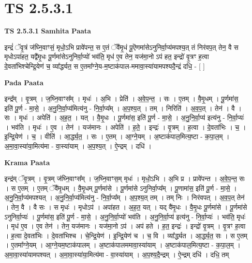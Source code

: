\documentclass[17pt]{extarticle}
\begin{document}
\section{ TS 2.5.3.1 }

\textbf{TS 2.5.3.1 } \newline
\textbf{Samhita Paata} \newline

इन्द्रं॑ ॅवृ॒त्रं ज॑घ्नि॒वाꣳसं॒ मृधो॒ऽभि प्रावे॑पन्त॒ स ए॒तं ॅवै॑मृ॒धं पू॒ऎणमा॑सेऽनुनिर्वा॒प्य॑मपश्य॒त् तं निर॑वप॒त् तेन॒ वै स मृधोऽपा॑हत॒ यद्वै॑मृ॒धः पू॒र्णमा॑सेऽनुनिर्वा॒प्यो॑ भव॑ति॒ मृध॑ ए॒व तेन॒ यज॑मा॒नो ऽप॑ हत॒ इन्द्रो॑ वृ॒त्रꣳ ह॒त्वा दे॒वता॑भिश्चेन्द्रि॒येण॑ च॒ व्या᳚र्द्ध्यत॒ स ए॒तमा᳚ग्ने॒य-म॒ष्टाक॑पाल-ममावा॒स्या॑यामपश्यदै॒न्द्रं दधि॒ - [  ] \newline

\textbf{Pada Paata} \newline

इन्द्र᳚म् । वृ॒त्रम् । ज॒घ्नि॒वाꣳस᳚म् । मृधः॑ । अ॒भि । प्रेति॑ । अ॒वे॒प॒न्त॒ । सः । ए॒तम् । वै॒मृ॒धम् । पू॒र्णमा॑स॒ इति॑ पू॒र्ण - मा॒से॒ । अ॒नु॒नि॒र्वा॒प्य॑मित्य॑नु - नि॒र्वा॒प्य᳚म् । अ॒प॒श्य॒त् । तम् । निरिति॑ । अ॒व॒प॒त् । तेन॑ । वै । सः । मृधः॑ । अपेति॑ । अ॒ह॒त॒ । यत् । वै॒मृ॒धः । पू॒र्णमा॑स॒ इति॑ पू॒र्ण - मा॒से॒ । अ॒नु॒नि॒र्वा॒प्य॑ इत्य॑नु - नि॒र्वा॒प्यः॑ । भव॑ति । मृधः॑ । ए॒व । तेन॑ । यज॑मानः । अपेति॑ । ह॒ते॒ । इन्द्रः॑ । वृ॒त्रम् । ह॒त्वा । दे॒वता॑भिः । च॒ । इ॒न्द्रि॒येण॑ । च॒ । वीति॑ । आ॒र्द्ध्य॒त॒ । सः । ए॒तम् । आ॒ग्ने॒यम् । अ॒ष्टाक॑पाल॒मित्य॒ष्टा - क॒पा॒ल॒म् । अ॒मा॒वा॒स्या॑या॒मित्य॑मा - वा॒स्या॑याम् । अ॒प॒श्य॒त् । ऐ॒न्द्रम् । दधि॑ ।  \newline


\textbf{Krama Paata} \newline

इन्द्र॑म् ॅवृ॒त्रम् । वृ॒त्रम् ज॑घ्नि॒वाꣳस᳚म् । ज॒घ्नि॒वाꣳस॒म् मृधः॑ । मृधो॒ऽभि । अ॒भि प्र । प्रावे॑पन्त । अ॒वे॒प॒न्त॒ सः । स ए॒तम् । ए॒तम् ॅवै॑मृ॒धम् । वै॒मृ॒धम् पू॒र्णमा॑से । पू॒र्णमा॑से ऽनुनिर्वा॒प्य᳚म् । पू॒णामा॑स॒ इति॑ पू॒र्ण - मा॒से॒ । अ॒नु॒नि॒र्वा॒प्य॑मपश्यत् । अ॒नु॒नि॒र्वा॒प्य॑मित्य॑नु - नि॒र्वा॒प्य᳚म् । अ॒प॒श्य॒त् तम् । तम् निः । निर॑वपत् । अ॒व॒प॒त् तेन॑ । तेन॒ वै । वै सः । स मृधः॑ । मृधोऽप॑ । अपा॑हत । अ॒ह॒त॒ यत् । यद् वै॑मृ॒धः । वै॒मृ॒धः पू॒र्णमा॑से । पू॒र्णमा॑से ऽनुनिर्वा॒प्यः॑ । पू॒र्णमा॑स॒ इति॑ पू॒र्ण - मा॒से॒ । अ॒नु॒नि॒र्वा॒प्यो॑ भव॑ति । अ॒नु॒नि॒र्वा॒प्य॑ इत्य॑नु - नि॒र्वा॒प्यः॑ । भव॑ति॒ मृधः॑ । मृध॑ ए॒व । ए॒व तेन॑ । तेन॒ यज॑मानः । यज॑मा॒नो ऽप॑ । अप॑ हते । ह॒त॒ इन्द्रः॑ । इन्द्रो॑ वृ॒त्रम् । वृ॒त्रꣳ ह॒त्वा । ह॒त्वा दे॒वता॑भिः । दे॒वता॑भिश्च । चे॒न्द्रि॒येण॑ । इ॒न्द्रि॒येण॑ च । च॒ वि । व्या᳚र्द्ध्यत । आ॒र्द्ध्य॒त॒ सः । स ए॒तम् । ए॒तमा᳚ग्ने॒यम् । आ॒ग्ने॒यम॒ष्टाक॑पालम् । अ॒ष्टाक॑पालममावा॒स्या॑याम् । अ॒ष्टाक॑पाल॒मित्य॒ष्टा - क॒पा॒ल॒म् । अ॒मा॒वा॒स्या॑यामपश्यत् । अ॒मा॒वा॒स्या॑या॒मित्य॑मा - वा॒स्या॑याम् । अ॒प॒श्य॒दै॒न्द्रम् । ऐ॒न्द्रम् दधि॑ । दधि॒ तम् \newline
\end{document}
